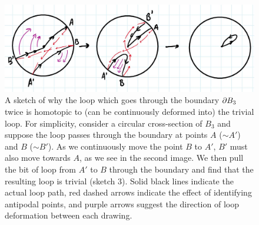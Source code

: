 \begin{figure}\label{z2inso3}
\includegraphics[scale=0.6]{2018/10/20181009_img2}
\caption{A sketch of why the loop which goes through the boundary $\partial B_3$ twice is homotopic to (can be continuously deformed into) the trivial loop. For simplicity, consider a circular cross-section of $B_3$ and suppose the loop passes through the boundary at points $A$ ($\sim A'$) and $B$ ($\sim B'$). As we continuously move the point $B$ to $A'$, $B'$ must also move towards $A$, as we see in the second image. We then pull the bit of loop from $A'$ to $B$ through the boundary and find that the resulting loop is trivial (sketch 3). Solid black lines indicate the actual loop path, red dashed arrows indicate the effect of identifying antipodal points, and purple arrows suggest the direction of loop deformation between each drawing.}
\end{figure}